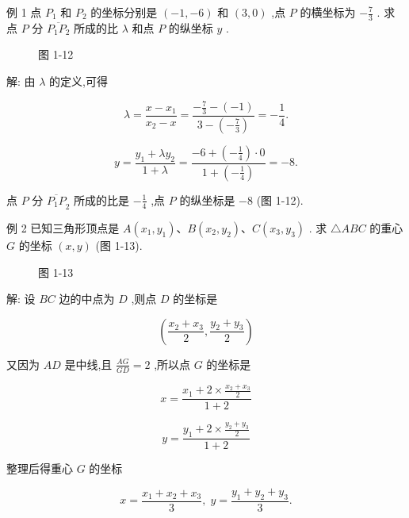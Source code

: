 \documentclass[lang=cn,newtx,12pt,scheme=chinese]{elegantbook}
\begin{document}
例 1 点 \({P}_{1}\) 和 \({P}_{2}\) 的坐标分别是 \(\left( {-1, - 6}\right)\) 和 \(\left( {3,0}\right)\) ,点 \(P\) 的横坐标为 \(- \frac{7}{3}\) . 求点 \(P\) 分 \(\overline{{P}_{1}{P}_{2}}\) 所成的比 \(\lambda\) 和点 \(P\) 的纵坐标 \(y\) .

\begin{figure}[h]
	\centering
	
	\caption{图 1-12}
\end{figure}

解: 由 \(\lambda\) 的定义,可得

\[
  \lambda = \frac{x - {x}_{1}}{{x}_{2} - x} = \frac{-\frac{7}{3} - \left( {-1}\right) }{3 - \left( {-\frac{7}{3}}\right) } = - \frac{1}{4}.
\]

\[
  y = \frac{{y}_{1} + \lambda {y}_{2}}{1 + \lambda } = \frac{-6 + \left( {-\frac{1}{4}}\right) \cdot 0}{1 + \left( {-\frac{1}{4}}\right) } = - 8.
\]

点 \(P\) 分 \({\overline{{P}_{1}P}}_{2}\) 所成的比是 \(- \frac{1}{4}\) ,点 \(P\) 的纵坐标是 \(- 8\) (图 1-12).

例 2 已知三角形顶点是 \(A\left( {{x}_{1},{y}_{1}}\right) \text{、}B\left( {{x}_{2},{y}_{2}}\right) \text{、}C\left( {{x}_{3},{y}_{3}}\right)\) . 求 \(\bigtriangleup {ABC}\) 的重心 \(G\) 的坐标 \(\left( {x,y}\right)\) (图 1-13).

\begin{figure}[h]
	\centering
	
	\caption{图 1-13}
\end{figure}

解: 设 \({BC}\) 边的中点为 \(D\) ,则点 \(D\) 的坐标是

\[
  \left( {\frac{{x}_{2} + {x}_{3}}{2},\frac{{y}_{2} + {y}_{3}}{2}}\right)
\]

又因为 \({AD}\) 是中线,且 \(\frac{AG}{GD} = 2\) ,所以点 \(G\) 的坐标是

\[
  x = \frac{{x}_{1} + 2 \times \frac{{x}_{2} + {x}_{3}}{2}}{1 + 2}
\]

\[
  y = \frac{{y}_{1} + 2 \times \frac{{y}_{2} + {y}_{3}}{2}}{1 + 2}
\]

整理后得重心 \(G\) 的坐标

\[
  x = \frac{{x}_{1} + {x}_{2} + {x}_{3}}{3},\;y = \frac{{y}_{1} + {y}_{2} + {y}_{3}}{3}.
\]
\end{document}
